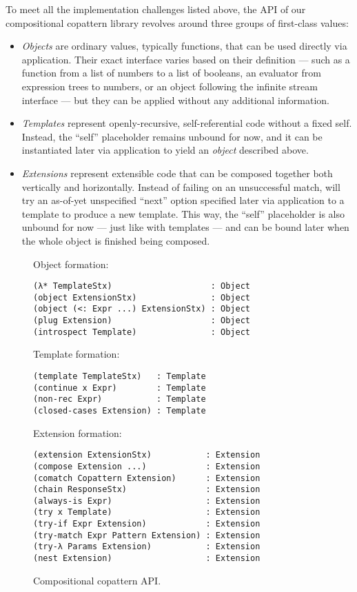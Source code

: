 To meet all the implementation challenges listed above, the API of our compositional copattern library revolves around three groups of first-class values:
\begin{itemize}
\item \emph{Objects} are ordinary values, typically functions, that can be used directly via application.  Their exact interface varies based on their definition --- such as a function from a list of numbers to a list of booleans, an evaluator from expression trees to numbers, or an object following the infinite stream interface --- but they can be applied without any additional information.
\item \emph{Templates} represent openly-recursive, self-referential code without a fixed self.
  Instead, the ``self'' placeholder remains unbound for now, and it can be instantiated later via application to yield an \emph{object} described above.
\item \emph{Extensions} represent extensible code that can be composed together both vertically and horizontally.
  Instead of failing on an unsuccessful match, will try an as-of-yet unspecified ``next'' option specified later via application to a template to produce a new template.
  This way, the ``self'' placeholder is also unbound for now --- just like with templates --- and can be bound later when the whole object is finished being composed.
\end{itemize}

\begin{figure}[t]
\centering

Object formation:
\begin{verbatim}
(λ* TemplateStx)                    : Object
(object ExtensionStx)               : Object
(object (<: Expr ...) ExtensionStx) : Object
(plug Extension)                    : Object
(introspect Template)               : Object
\end{verbatim}

Template formation:
\begin{verbatim}
(template TemplateStx)   : Template
(continue x Expr)        : Template
(non-rec Expr)           : Template
(closed-cases Extension) : Template
\end{verbatim}

Extension formation:
\begin{verbatim}
(extension ExtensionStx)           : Extension
(compose Extension ...)            : Extension
(comatch Copattern Extension)      : Extension
(chain ResponseStx)                : Extension
(always-is Expr)                   : Extension
(try x Template)                   : Extension
(try-if Expr Extension)            : Extension
(try-match Expr Pattern Extension) : Extension
(try-λ Params Extension)           : Extension
(nest Extension)                   : Extension
\end{verbatim}
\caption{Compositional copattern API.}
\label{fig:api}
\end{figure}

